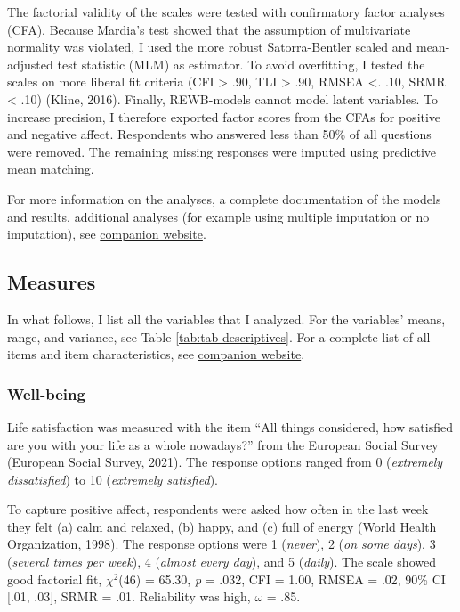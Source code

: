 \documentclass[
  man,mask]{apa6}
\begin{document}
The factorial validity of the scales were tested with confirmatory factor analyses (CFA).
Because Mardia's test showed that the assumption of multivariate normality was violated, I used the more robust Satorra-Bentler scaled and mean-adjusted test statistic (MLM) as estimator.
To avoid overfitting, I tested the scales on more liberal fit criteria (CFI \textgreater{} .90, TLI \textgreater{} .90, RMSEA \textless. .10, SRMR \textless{} .10) (Kline, 2016).
Finally, REWB-models cannot model latent variables.
To increase precision, I therefore exported factor scores from the CFAs for positive and negative affect.
Respondents who answered less than 50\% of all questions were removed.
The remaining missing responses were imputed using predictive mean matching.

For more information on the analyses, a complete documentation of the models and results, additional analyses (for example using multiple imputation or no imputation), see \href{https://XMtRA.github.io/Austrian_Corona_Panel_Project}{companion website}.

\hypertarget{measures}{%
\subsection{Measures}\label{measures}}

In what follows, I list all the variables that I analyzed.
For the variables' means, range, and variance, see Table \ref{tab:tab-descriptives}.
For a complete list of all items and item characteristics, see \href{https://XMtRA.github.io/Austrian_Corona_Panel_Project}{companion website}.

\hypertarget{well-being}{%
\subsubsection{Well-being}\label{well-being}}

Life satisfaction was measured with the item ``All things considered, how satisfied are you with your life as a whole nowadays?'' from the European Social Survey (European Social Survey, 2021).
The response options ranged from 0 (\emph{extremely dissatisfied}) to 10 (\emph{extremely satisfied}).

To capture positive affect, respondents were asked how often in the last week they felt (a) calm and relaxed, (b) happy, and (c) full of energy (World Health Organization, 1998).
The response options were 1 (\emph{never}), 2 (\emph{on some days}), 3 (\emph{several times per week}), 4 (\emph{almost every day}), and 5 (\emph{daily}).
The scale showed good factorial fit, \(\chi^2\)(46) = 65.30, \emph{p} = .032, CFI = 1.00, RMSEA = .02, 90\% CI {[}.01, .03{]}, SRMR = .01.
Reliability was high, \(\omega\) = .85.
\end{document}
